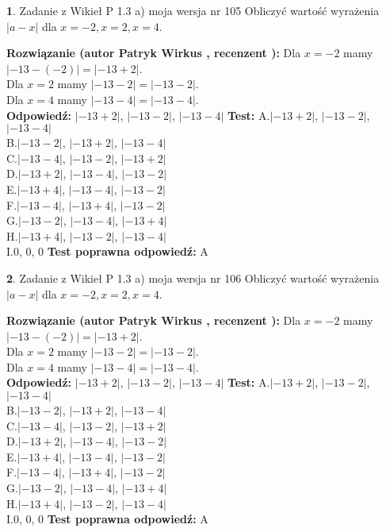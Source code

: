 \documentclass[12pt, a4paper]{article}
\theoremstyle{definition} %
\newtheorem{zad}{}
\newcommand{\zadStart}[1]{\begin{zad}#1\newline}
\newcommand{\zadStop}{\end{zad}}
\newcommand{\rozwStart}[2]{\noindent \textbf{Rozwiązanie (autor #1 , recenzent #2): }\newline}
\newcommand{\rozwStop}{\newline}
\newcommand{\odpStart}{\noindent \textbf{Odpowiedź:}\newline}
\newcommand{\odpStop}{\newline}
\newcommand{\testStart}{\noindent \textbf{Test:}\newline}
\newcommand{\testStop}{\newline}
\newcommand{\kluczStart}{\noindent \textbf{Test poprawna odpowiedź:}\newline}
\newcommand{\kluczStop}{\newline}
\begin{document}
\zadStart{Zadanie z Wikieł P 1.3 a) moja wersja nr 105}
Obliczyć wartość wyrażenia $|a - x|$ dla $x=-2,x=2,x=4$.
\zadStop
\rozwStart{Patryk Wirkus}{}
Dla $x = -2$ mamy $|-13 - (-2)| = |-13 + 2|$.\\
Dla $x = 2$ mamy $|-13 - 2| = |-13 - 2|$.\\
Dla $x = 4$ mamy $|-13 - 4| = |-13 - 4|$.\\
\rozwStop
\odpStart
$|-13 + 2|$, $|-13 - 2|$, $|-13 - 4|$
\odpStop
\testStart
A.$|-13 + 2|$, $|-13 - 2|$, $|-13 - 4|$\\
B.$|-13 - 2|$, $|-13 + 2|$, $|-13 - 4|$\\
C.$|-13 - 4|$, $|-13 - 2|$, $|-13 + 2|$\\
D.$|-13 + 2|$, $|-13 - 4|$, $|-13 - 2|$\\
E.$|-13 + 4|$, $|-13 - 4|$, $|-13 - 2|$\\
F.$|-13 - 4|$, $|-13 + 4|$, $|-13 - 2|$\\
G.$|-13 - 2|$, $|-13 - 4|$, $|-13 + 4|$\\
H.$|-13 + 4|$, $|-13 - 2|$, $|-13 - 4|$\\
I.$0$, $0$, $0$
\testStop
\kluczStart
A
\kluczStop



\zadStart{Zadanie z Wikieł P 1.3 a) moja wersja nr 106}
Obliczyć wartość wyrażenia $|a - x|$ dla $x=-2,x=2,x=4$.
\zadStop
\rozwStart{Patryk Wirkus}{}
Dla $x = -2$ mamy $|-13 - (-2)| = |-13 + 2|$.\\
Dla $x = 2$ mamy $|-13 - 2| = |-13 - 2|$.\\
Dla $x = 4$ mamy $|-13 - 4| = |-13 - 4|$.\\
\rozwStop
\odpStart
$|-13 + 2|$, $|-13 - 2|$, $|-13 - 4|$
\odpStop
\testStart
A.$|-13 + 2|$, $|-13 - 2|$, $|-13 - 4|$\\
B.$|-13 - 2|$, $|-13 + 2|$, $|-13 - 4|$\\
C.$|-13 - 4|$, $|-13 - 2|$, $|-13 + 2|$\\
D.$|-13 + 2|$, $|-13 - 4|$, $|-13 - 2|$\\
E.$|-13 + 4|$, $|-13 - 4|$, $|-13 - 2|$\\
F.$|-13 - 4|$, $|-13 + 4|$, $|-13 - 2|$\\
G.$|-13 - 2|$, $|-13 - 4|$, $|-13 + 4|$\\
H.$|-13 + 4|$, $|-13 - 2|$, $|-13 - 4|$\\
I.$0$, $0$, $0$
\testStop
\kluczStart
A
\kluczStop
\end{document}
